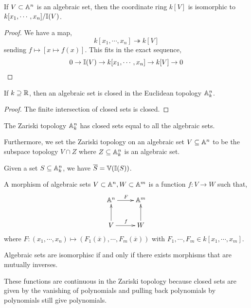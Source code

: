 \documentclass[12pt]{amsart}
\begin{document}
\begin{lemma}
    If $V \subset \mathbb A^n$ is an algebraic set, then the coordinate ring $k[V]$ is isomorphic to $k[x_1, \cdots, x_n]/\mathbb I(V)$. 
\end{lemma}
\begin{proof}
    We have a map,
    \[ k[x_1, \cdots, x_n] \twoheadrightarrow k[V] \]
    sending $f \mapsto [x \mapsto f(x)]$. This fits in the exact sequence,
    \[ 0 \to \mathbb I(V) \to k[x_1, \cdots, x_n] \to k[V] \to 0\]
\end{proof}

\begin{lemma}
    If $k \supseteq \mathbb R$, then an algebraic set is closed in the Euclidean topology $\mathbb A^n_k$. 
\end{lemma}
\begin{proof}
    The finite intersection of closed sets is closed.
\end{proof}

\begin{definition}
    The Zariski topology $\mathbb A^n_k$ has closed sets equal to all the algebraic sets. 
\end{definition}

Furthermore, we set the Zariski topology on an algebraic set $V \subseteq \mathbb A^n$ to be the subspace topology $V \cap Z$ where $Z \subseteq \mathbb A^n_k$ is an algebraic set. 

Given a set $S \subseteq \mathbb A^n_k$, we have $\overline{S} = \mathbb V(\mathbb I(S))$. 

\begin{definition}
    A morphism of algebraic sets $V \subset \mathbb A^n, W \subset \mathbb A^m$ is a function $f: V \to W$ such that, 
    \[ \xymatrix{ \A^n \ar[r]^F & \A^m \\ V \ar[u] \ar[r]^f & W \ar[u] }\]
    where $F: (x_1, \cdots, x_n) \mapsto (F_1(\overline x), \cdots, F_m(\overline x))$ with $F_1, \cdots, F_m \in k[x_1, \cdots, x_m]$.
\end{definition}

\begin{definition}
    Algebraic sets are isomorphisc if and only if there exists morphisms that are mutually inverses. 
\end{definition}

\begin{remark}
    These functions are continuous in the Zariski topology because closed sets are given by the vanishing of polynomials and pulling back polynomials by polynomials still give polynomials. 
\end{remark}
\end{document}
